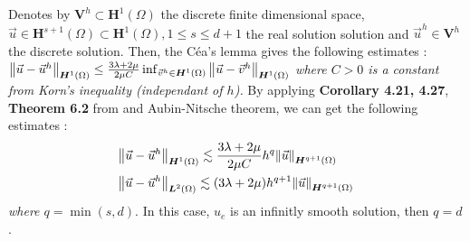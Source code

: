 \documentclass[a4paper,12pt,twoside]{report}
\begin{document}
Denotes by $\boldsymbol V^h \subset \boldsymbol H^1(\Omega)$ the discrete finite dimensional space, $\vec u \in \boldsymbol H^{s+1}(\Omega) \subset \boldsymbol H^1(\Omega), 1 \leq s \leq d+1$ the real solution solution and $\vec u^h \in \boldsymbol V^h$ the discrete solution.
Then, the Céa's lemma gives the following estimates : 
$\norm{\vec u - \vec u^h}_{\boldsymbol H^1(\Omega)} \leq \frac{3\lambda + 2\mu}{2\mu C} \inf_{\vec v^h \in \boldsymbol H^1(\Omega)} \norm{\vec u - \vec v^h}_{\boldsymbol H^1(\Omega)}$
\textit{where $C > 0$ is a constant from Korn's inequality (independant of $h$).}
By applying \textbf{Corollary 4.21, 4.27}, \textbf{Theorem 6.2} from \cite{da_veiga_mathematical_2014} and Aubin-Nitsche theorem, we can get the following estimates : 
\begin{equation}
\begin{aligned}
& \norm{\vec u - \vec u^h}_{\boldsymbol H^1(\Omega)} \lesssim \frac{3\lambda + 2\mu}{2\mu C} h^q \norm{\vec u}_{\boldsymbol H^{q+1}(\Omega)} \\
& \norm{\vec u - \vec u^h}_{\boldsymbol L^2(\Omega)} \lesssim (3\lambda + 2\mu) h^{q+1}\norm{\vec u}_{\boldsymbol H^{q+1}(\Omega)}
\end{aligned}
\label{eq:convergence_estimates}
\end{equation}
\textit{where $q = \min{(s,d)}$}. In this case, $u_e$ is an infinitly smooth solution, then $q = d$. 
\end{document}

